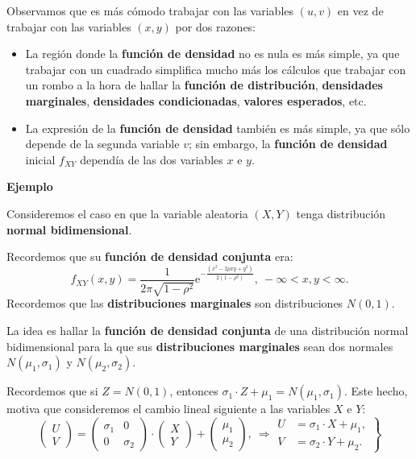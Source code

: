 \documentclass[]{book}
\providecommand{\tightlist}{%
  \setlength{\itemsep}{0pt}\setlength{\parskip}{0pt}}
\begin{document}
Observamos que es más cómodo trabajar con las variables \((u,v)\) en vez de trabajar con las variables \((x,y)\) por dos razones:

\begin{itemize}
\tightlist
\item
  La región donde la \textbf{función de densidad} no es nula es más simple, ya que trabajar con un cuadrado simplifica mucho más los cálculos que trabajar con un rombo a la hora de hallar la \textbf{función de distribución}, \textbf{densidades marginales}, \textbf{densidades condicionadas}, \textbf{valores esperados}, etc.
\item
  La expresión de la \textbf{función de densidad} también es más simple, ya que sólo depende de la segunda variable \(v\); sin embargo, la \textbf{función de densidad} inicial \(f_{XY}\) dependía de las dos variables \(x\) e \(y\).
\end{itemize}

\textbf{Ejemplo}

Consideremos el caso en que la variable aleatoria \((X,Y)\) tenga distribución \textbf{normal bidimensional}.

Recordemos que su \textbf{función de densidad conjunta} era:
\[
f_{XY}(x,y)=\frac{1}{2\pi\sqrt{1-\rho^2}}\mathrm{e}^{-\frac{(x^2-2\rho xy+y^2)}{2(1-\rho^2)}},\ -\infty <x,y<\infty.
\]
Recordemos que las \textbf{distribuciones marginales} son distribuciones \(N(0,1)\).

La idea es hallar la \textbf{función de densidad conjunta} de una distribución normal bidimensional para la que sus \textbf{distribuciones marginales} sean dos normales \(N(\mu_1,\sigma_1)\) y \(N(\mu_2,\sigma_2)\).

Recordemos que si \(Z=N(0,1)\), entonces \(\sigma_1\cdot Z+\mu_1 =N(\mu_1,\sigma_1)\). Este hecho, motiva que consideremos el cambio lineal siguiente a las variables \(X\) e \(Y\):
\[
\begin{pmatrix}U\\ V\end{pmatrix}=\begin{pmatrix}\sigma_1 & 0\\ 0& \sigma_2\end{pmatrix}\cdot\begin{pmatrix}X\\ Y\end{pmatrix}+\begin{pmatrix}\mu_1\\\mu_2\end{pmatrix},\ \Rightarrow \left.\begin{array}{rl}U & = \sigma_1\cdot X+\mu_1,\\ V & =\sigma_2\cdot Y+\mu_2.\end{array}\right\}
\]
\end{document}
